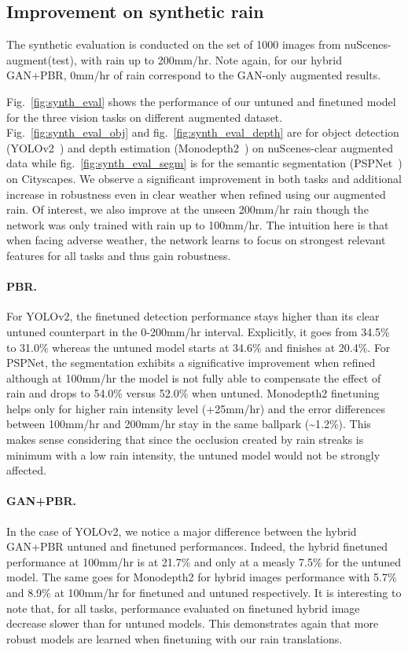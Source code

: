 \subsection{Improvement on synthetic rain}
\label{sec:perf_synth_data}

The synthetic evaluation is conducted on the set of 1000 images from nuScenes-augment(test), with rain up to 200mm/hr. Note again, for our hybrid GAN+PBR, 0mm/hr of rain correspond to the GAN-only augmented results.

Fig.~\ref{fig:synth_eval} shows the performance of our untuned and finetuned model for the three vision tasks on different augmented dataset. Fig.~\ref{fig:synth_eval_obj} and fig.~\ref{fig:synth_eval_depth} are for object detection (YOLOv2~\cite{redmon2017yolo9000}) and depth estimation (Monodepth2~\cite{godard2019digging}) on nuScenes-clear augmented data while fig.~\ref{fig:synth_eval_segm} is for the semantic segmentation (PSPNet~\cite{zhao2017pspnet}) on Cityscapes. We observe a significant improvement in both tasks and additional increase in robustness even in clear weather when refined using our augmented rain. Of interest, we also improve at the unseen 200mm/hr rain though the network was only trained with rain up to 100mm/hr.
The intuition here is that when facing adverse weather, the network learns to focus on strongest relevant features for all tasks and thus gain robustness. 

\paragraph{PBR.} For YOLOv2, the finetuned detection performance stays higher than its clear untuned counterpart in the 0-200mm/hr interval. Explicitly, it goes from 34.5\% to 31.0\% whereas the untuned model starts at 34.6\% and finishes at 20.4\%. For PSPNet, the segmentation exhibits a significative improvement when refined although at 100mm/hr the model is not fully able to compensate the effect of rain and drops to 54.0\% versus 52.0\% when untuned. Monodepth2 finetuning helps only for higher rain intensity level (+25mm/hr) and the error differences between 100mm/hr and 200mm/hr stay in the same ballpark (\textasciitilde{}1.2\%). This makes sense considering that since the occlusion created by rain streaks is minimum with a low rain intensity, the untuned model would not be strongly affected.

\paragraph{GAN+PBR.} In the case of YOLOv2, we notice a major difference between the hybrid  GAN+PBR untuned and finetuned performances. Indeed, the hybrid finetuned performance at 100mm/hr is at 21.7\% and only at a measly 7.5\% for the untuned model. The same goes for Monodepth2 for hybrid images performance with 5.7\% and 8.9\% at 100mm/hr for finetuned and untuned respectively. 
It is interesting to note that, for all tasks, performance evaluated on finetuned hybrid image decrease slower than for untuned models. This demonstrates again that more robust models are learned when finetuning with our rain translations.

